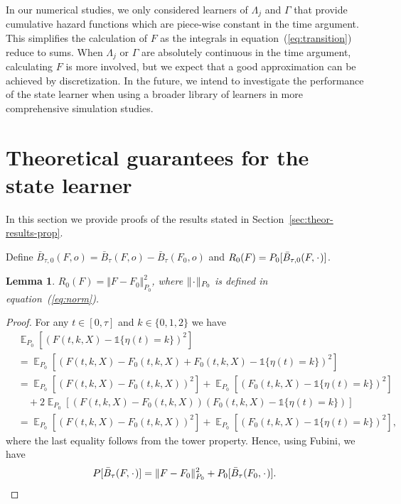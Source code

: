 \documentclass{statsoc}
\numberwithin{theorem}{section}
\newtheorem{lemma}[theorem]{Lemma}
\DeclareMathOperator{\E}{\mathbb{E}} %
\newcommand{\blank}{\makebox[1ex]{\textbf{$\cdot$}}}
\newcommand{\1}{\mathds{1}}
\begin{document}
In our numerical studies, we only considered learners of $\Lambda_j$ and
$\Gamma$ that provide cumulative hazard functions which are piece-wise constant
in the time argument. This simplifies the calculation of \( F \) as the
integrals in equation~(\ref{eq:transition}) reduce to sums. When $\Lambda_j$ or
\( \Gamma \) are absolutely continuous in the time argument, calculating \( F \)
is more involved, but we expect that a good approximation can be achieved by
discretization. In the future, we intend to investigate the performance of the
state learner when using a broader library of learners in more comprehensive
simulation studies.



\appendix

\section{Theoretical guarantees for the state learner}
\label{sec:proof-proposition}

In this section we provide proofs of the results stated in
Section~\ref{sec:theor-results-prop}.

Define
\( \bar{B}_{\tau,0}(F, o) = \bar{B}_{\tau}(F, o) - \bar{B}_{\tau}(F_0, o) \) and
\( R_{0}(F) = P_0{[\bar{B}_{\tau,0}(F, \blank)]} \).
\begin{lemma}
  \label{lemma:norm}
  \( R_{0}(F) = \Vert F - F_0 \Vert_{P_0}^2 \), where \( \Vert \blank \Vert_{P_0}\) is defined
  in equation~(\ref{eq:norm}).
\end{lemma}
\begin{proof}
  For any \( t \in [0, \tau] \) and \( k\in \{0,1,2\} \) we have
  \begin{align*}
    & \E_{P_0}{\left[ (F(t, k, X) - \1{\{\eta(t) = k \}})^2 \right]}
    \\
    & =    \E_{P_0}{\left[ (F(t, k, X) - F_0(t, k, X) + F_0(t, k, X) - \1{\{\eta(t) = k
      \}})^2 \right]}
    \\
    & =    \E_{P_0}{\left[ (F(t, k, X) - F_0(t, k, X))^2\right]}
      + \E_{P_0}{\left[ (F_0(t, k, X) - \1{\{\eta(t) = k \}})^2\right]}
    \\
    & \quad
      + 2\E_{P_0}{\left[ (F(t, k, X) - F_0(t, k, X))(F_0(t, k, X) - \1{\{\eta(t) = k
      \}})\right]}
    \\
    & =    \E_{P_0}{\left[ (F(t, k, X) - F_0(t, k, X))^2\right]}
      + \E_{P_0}{\left[ (F_0(t, k, X) - \1{\{\eta(t) = k \}})^2\right]},
  \end{align*}
  where the last equality follows from the tower property. Hence, using Fubini,
  we have
  \begin{equation*}
    P{[\bar{B}_{\tau}(F, \blank)]}
    = \Vert F - F_0 \Vert_{P_0}^2 + P_0{[\bar{B}_{\tau}(F_0, \blank)]}.
  \end{equation*}
\end{proof}
\end{document}
